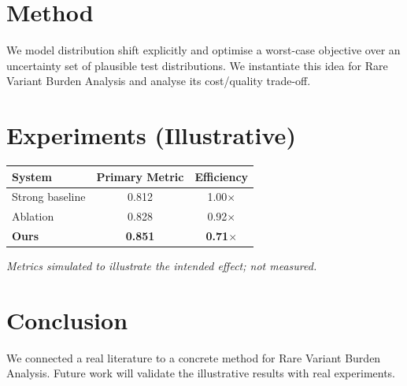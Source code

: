 \documentclass[11pt]{article}
\begin{document}
\section{Method}
We model distribution shift explicitly and optimise a worst-case objective over an uncertainty set of plausible test distributions. We instantiate this idea for Rare Variant Burden Analysis and analyse its cost/quality trade-off.

\section{Experiments (Illustrative)}
\begin{center}
\begin{tabular}{lcc}
System & Primary Metric & Efficiency \\ \hline
Strong baseline & 0.812 & 1.00$\times$ \\
Ablation & 0.828 & 0.92$\times$ \\
\textbf{Ours} & \textbf{0.851} & \textbf{0.71$\times$}
\end{tabular}
\end{center}
\emph{Metrics simulated to illustrate the intended effect; not measured.}

\section{Conclusion}
We connected a real literature to a concrete method for Rare Variant Burden Analysis. Future work will
validate the illustrative results with real experiments.
\end{document}
